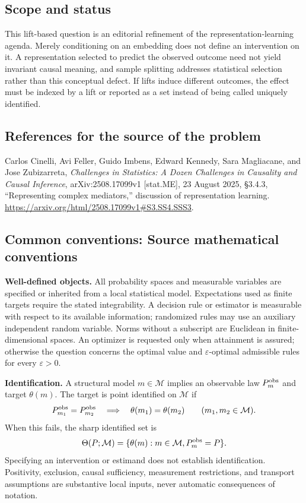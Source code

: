 \documentclass[11pt,a4paper]{article}
\begin{document}
\subsection*{Scope and status}
This lift-based question is an editorial refinement of the representation-learning agenda. Merely conditioning on an embedding does not define an intervention on it. A representation selected to predict the observed outcome need not yield invariant causal meaning, and sample splitting addresses statistical selection rather than this conceptual defect. If lifts induce different outcomes, the effect must be indexed by a lift or reported as a set instead of being called uniquely identified.
\subsection*{References for the source of the problem}
Carlos Cinelli, Avi Feller, Guido Imbens, Edward Kennedy, Sara Magliacane, and Jose Zubizarreta, \emph{Challenges in Statistics: A Dozen Challenges in Causality and Causal Inference}, arXiv:2508.17099v1 [stat.ME], 23 August 2025, \S3.4.3, ``Representing complex mediators,'' discussion of representation learning. \url{https://arxiv.org/html/2508.17099v1#S3.SS4.SSS3}.

\subsection*{Common conventions: Source mathematical conventions}

\textbf{Well-defined objects.}
All probability spaces and measurable variables are specified or inherited
from a local statistical model. Expectations used as finite targets require
the stated integrability. A decision rule or estimator is measurable with
respect to its available information; randomized rules may use an auxiliary
independent random variable. Norms without a subscript are Euclidean in
finite-dimensional spaces. An optimizer is requested only when attainment
is assured; otherwise the question concerns the optimal value and
$\varepsilon$-optimal admissible rules for every $\varepsilon>0$.

\textbf{Identification.}
A structural model $m\in\mathcal M$ implies an observable law
$P_m^{\rm obs}$ and target $\theta(m)$. The target is point identified on
$\mathcal M$ if
\[
 P_{m_1}^{\rm obs}=P_{m_2}^{\rm obs}
 \quad\Longrightarrow\quad\theta(m_1)=\theta(m_2)
 \qquad(m_1,m_2\in\mathcal M).
\]
When this fails, the sharp identified set is
\[
 \Theta(P;\mathcal M)=\{\theta(m):m\in\mathcal M,
                                  P_m^{\rm obs}=P\}.
\]
Specifying an intervention or estimand does not establish identification.
Positivity, exclusion, causal sufficiency, measurement restrictions, and
transport assumptions are substantive local inputs, never automatic
consequences of notation.
\end{document}

